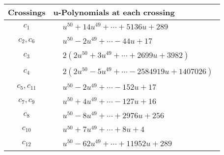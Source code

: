 \documentclass[1p]{elsarticle_modified}
\theoremstyle{definition}
\begin{document}
\begin{tabular}{m{50pt}|m{274pt}}
Crossings & \hspace{64pt}u-Polynomials at each crossing \\
\hline $$\begin{aligned}c_{1}\end{aligned}$$&$\begin{aligned}
&u^{50}+14 u^{49}+\cdots+5136 u+289
\end{aligned}$\\
\hline $$\begin{aligned}c_{2},c_{6}\end{aligned}$$&$\begin{aligned}
&u^{50}-2 u^{49}+\cdots-44 u+17
\end{aligned}$\\
\hline $$\begin{aligned}c_{3}\end{aligned}$$&$\begin{aligned}
&2(2 u^{50}+3 u^{49}+\cdots+2699 u+3982)
\end{aligned}$\\
\hline $$\begin{aligned}c_{4}\end{aligned}$$&$\begin{aligned}
&2(2 u^{50}-5 u^{49}+\cdots-2584919 u+1407026)
\end{aligned}$\\
\hline $$\begin{aligned}c_{5},c_{11}\end{aligned}$$&$\begin{aligned}
&u^{50}-2 u^{49}+\cdots-152 u+17
\end{aligned}$\\
\hline $$\begin{aligned}c_{7},c_{9}\end{aligned}$$&$\begin{aligned}
&u^{50}+4 u^{49}+\cdots-127 u+16
\end{aligned}$\\
\hline $$\begin{aligned}c_{8}\end{aligned}$$&$\begin{aligned}
&u^{50}-8 u^{49}+\cdots+2976 u+256
\end{aligned}$\\
\hline $$\begin{aligned}c_{10}\end{aligned}$$&$\begin{aligned}
&u^{50}+7 u^{49}+\cdots+8 u+4
\end{aligned}$\\
\hline $$\begin{aligned}c_{12}\end{aligned}$$&$\begin{aligned}
&u^{50}-62 u^{49}+\cdots+11952 u+289
\end{aligned}$\\
\hline
\end{tabular}\\~\\
\end{document}
